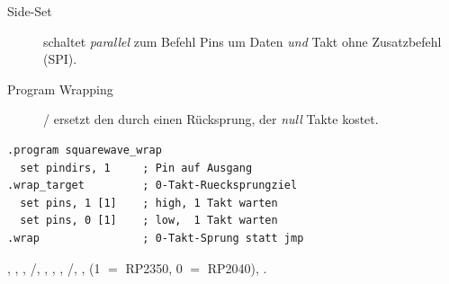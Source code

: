 \begin{description}
\item[Side-Set] schaltet \emph{parallel} zum Befehl Pins um
  \ra Daten \emph{und} Takt ohne Zusatzbefehl (SPI).
\item[Program Wrapping] / ersetzt den 
  durch einen Rücksprung, der \emph{null} Takte kostet.
\end{description}

\begin{lstlisting}
.program squarewave_wrap
  set pindirs, 1     ; Pin auf Ausgang
.wrap_target         ; 0-Takt-Ruecksprungziel
  set pins, 1 [1]    ; high, 1 Takt warten
  set pins, 0 [1]    ; low,  1 Takt warten
.wrap                ; 0-Takt-Sprung statt jmp
\end{lstlisting}

 , , ,
/,
, , ,
/, , 
(1 $=$ RP2350, 0 $=$ RP2040), .

